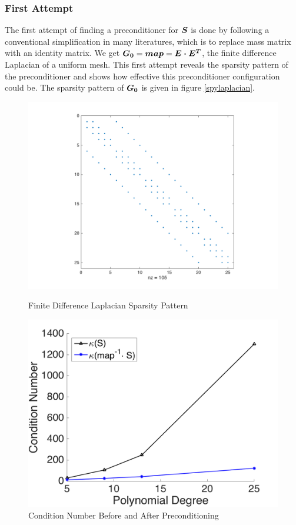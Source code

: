 \subsubsection{First Attempt}
The first attempt of finding a preconditioner for $\boldsymbol{S}$ is done by following a conventional simplification in many literatures, which is to replace mass matrix with an identity matrix. We get $\boldsymbol{G_0} = \boldsymbol{map} = \boldsymbol{E\cdot E^T}$, the finite difference Laplacian of a uniform mesh. This first attempt reveals the sparsity pattern of the preconditioner and shows how effective this preconditioner configuration could be. The sparsity pattern of $\boldsymbol{G_0}$ is given in figure \ref{spylaplacian}.
\begin{figure}
	\includegraphics[width=\linewidth]{spy_map}
	\caption{Finite Difference Laplacian Sparsity Pattern}
	\label{spylaplacian}
	\endminipage \hfill
	\includegraphics[width=\linewidth]{firstattempt}
	\caption{Condition Number Before and After Preconditioning}
	\label{firstatt}
	\endminipage 
\end{figure}
